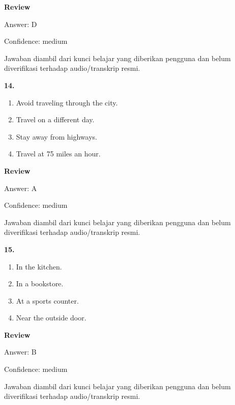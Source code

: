 \documentclass[12pt]{article}
\begin{document}
\par
\begingroup
\setlength{\parskip}{0pt}
\setlength{\parindent}{0pt}
\textbf{Review}\par
Answer: D\par
Confidence: medium\par
Jawaban diambil dari kunci belajar yang diberikan pengguna dan belum diverifikasi terhadap audio/transkrip resmi.\par
\endgroup
\par
\vspace{0.25\baselineskip}
\noindent\textbf{14.}
\begin{enumerate}[label=(\Alph*),leftmargin=*,itemsep=0.2em]
\item Avoid traveling through the city.
\item Travel on a different day.
\item Stay away from highways.
\item Travel at 75 miles an hour.
\end{enumerate}
\par
\begingroup
\setlength{\parskip}{0pt}
\setlength{\parindent}{0pt}
\textbf{Review}\par
Answer: A\par
Confidence: medium\par
Jawaban diambil dari kunci belajar yang diberikan pengguna dan belum diverifikasi terhadap audio/transkrip resmi.\par
\endgroup
\par
\vspace{0.25\baselineskip}
\noindent\textbf{15.}
\begin{enumerate}[label=(\Alph*),leftmargin=*,itemsep=0.2em]
\item In the kitchen.
\item In a bookstore.
\item At a sports counter.
\item Near the outside door.
\end{enumerate}
\par
\begingroup
\setlength{\parskip}{0pt}
\setlength{\parindent}{0pt}
\textbf{Review}\par
Answer: B\par
Confidence: medium\par
Jawaban diambil dari kunci belajar yang diberikan pengguna dan belum diverifikasi terhadap audio/transkrip resmi.\par
\endgroup
\par
\vspace{0.25\baselineskip}
\end{document}
